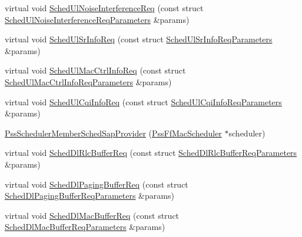 \begin{DoxyCompactItemize}
\item 
virtual void \hyperlink{classns3_1_1PssSchedulerMemberSchedSapProvider_a1bf4da8774ac5944d8661425406623d0}{Sched\+Ul\+Noise\+Interference\+Req} (const struct \hyperlink{structns3_1_1FfMacSchedSapProvider_1_1SchedUlNoiseInterferenceReqParameters}{Sched\+Ul\+Noise\+Interference\+Req\+Parameters} \&params)
\item 
virtual void \hyperlink{classns3_1_1PssSchedulerMemberSchedSapProvider_a91ab06d4f4f3e47f9d16fedcb9d2c272}{Sched\+Ul\+Sr\+Info\+Req} (const struct \hyperlink{structns3_1_1FfMacSchedSapProvider_1_1SchedUlSrInfoReqParameters}{Sched\+Ul\+Sr\+Info\+Req\+Parameters} \&params)
\item 
virtual void \hyperlink{classns3_1_1PssSchedulerMemberSchedSapProvider_a0e3df62a8f3a3c231dedc591ef7e24aa}{Sched\+Ul\+Mac\+Ctrl\+Info\+Req} (const struct \hyperlink{structns3_1_1FfMacSchedSapProvider_1_1SchedUlMacCtrlInfoReqParameters}{Sched\+Ul\+Mac\+Ctrl\+Info\+Req\+Parameters} \&params)
\item 
virtual void \hyperlink{classns3_1_1PssSchedulerMemberSchedSapProvider_a420edb1b3697a12cda9da6607947480d}{Sched\+Ul\+Cqi\+Info\+Req} (const struct \hyperlink{structns3_1_1FfMacSchedSapProvider_1_1SchedUlCqiInfoReqParameters}{Sched\+Ul\+Cqi\+Info\+Req\+Parameters} \&params)
\item 
\hyperlink{classns3_1_1PssSchedulerMemberSchedSapProvider_aecd981f15efb501bc6e2b19f1c514640}{Pss\+Scheduler\+Member\+Sched\+Sap\+Provider} (\hyperlink{classns3_1_1PssFfMacScheduler}{Pss\+Ff\+Mac\+Scheduler} $\ast$scheduler)
\item 
virtual void \hyperlink{classns3_1_1PssSchedulerMemberSchedSapProvider_a04030c946308eff61f3c47e2909b4f01}{Sched\+Dl\+Rlc\+Buffer\+Req} (const struct \hyperlink{structns3_1_1FfMacSchedSapProvider_1_1SchedDlRlcBufferReqParameters}{Sched\+Dl\+Rlc\+Buffer\+Req\+Parameters} \&params)
\item 
virtual void \hyperlink{classns3_1_1PssSchedulerMemberSchedSapProvider_aa31eae2da587a0ab3608cd9ecaf94a31}{Sched\+Dl\+Paging\+Buffer\+Req} (const struct \hyperlink{structns3_1_1FfMacSchedSapProvider_1_1SchedDlPagingBufferReqParameters}{Sched\+Dl\+Paging\+Buffer\+Req\+Parameters} \&params)
\item 
virtual void \hyperlink{classns3_1_1PssSchedulerMemberSchedSapProvider_aa7bd90952571e9e72e9b226ce45f639e}{Sched\+Dl\+Mac\+Buffer\+Req} (const struct \hyperlink{structns3_1_1FfMacSchedSapProvider_1_1SchedDlMacBufferReqParameters}{Sched\+Dl\+Mac\+Buffer\+Req\+Parameters} \&params)
\item 

\end{DoxyCompactItemize}
